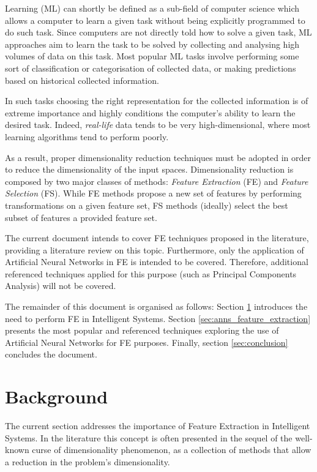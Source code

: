 \documentclass[9pt,journal,compsoc]{IEEEtran}
\begin{document}
 Learning (ML) can shortly be defined as a sub-field of computer science which allows a computer to learn a given task without being explicitly programmed to do such task. Since computers are not directly told how to solve a given task, ML approaches aim to learn the task to be solved by collecting and analysing high volumes of data on this task. Most popular ML tasks involve performing some sort of classification or categorisation of collected data, or making predictions based on historical collected information.

In such tasks choosing the right representation for the collected information is of extreme importance and highly conditions the computer's ability to learn the desired task. Indeed, \emph{real-life} data tends to be very high-dimensional, where most learning algorithms tend to perform poorly.

As a result, proper dimensionality reduction techniques must be adopted in order to reduce the dimensionality of the input spaces. Dimensionality reduction is composed by two major classes of methods: \emph{Feature Extraction} (FE) and \emph{Feature Selection} (FS). While FE methods propose a new set of features by performing transformations on a given feature set, FS methods (ideally) select the best subset of features a provided feature set.

The current document intends to cover FE techniques proposed in the literature, providing a literature review on this topic. Furthermore, only the application of Artificial Neural Networks in FE is intended to be covered. Therefore, additional referenced techniques applied for this purpose (such as Principal Components Analysis) will not be covered.

The remainder of this document is organised as follows: Section \ref{sec:background} introduces the need to perform FE in Intelligent Systems. Section \ref{sec:anns_feature_extraction} presents the most popular and referenced techniques exploring the use of Artificial Neural Networks for FE purposes. Finally, section \ref{sec:conclusion} concludes the document.

\section{Background}\label{sec:background}

The current section addresses the importance of Feature Extraction in Intelligent Systems. In the literature this concept is often presented in the sequel of the well-known curse of dimensionality phenomenon, as a collection of methods that allow a reduction in the problem's dimensionality.
\end{document}

